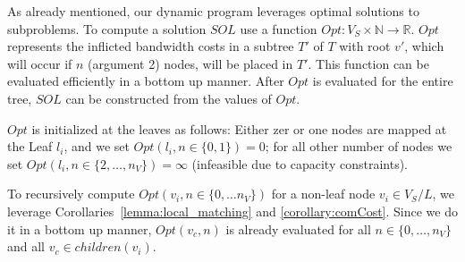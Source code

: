 \documentclass[9pt,twocolumn]{scrartcl}
\newcommand{\ChunkLocation}{\pi}
\newcommand{\SubstrateNodes}{\ensuremath{V_S}}
\newcommand{\SubstrateNode}{\ensuremath{v}}
\newcommand{\Leaf}{\ensuremath{l}}
\newcommand{\Leaves}{\ensuremath{L}}
\newcommand{\Chunks}{\ensuremath{\textsc{chunks}}}
\newcommand{\Opt}{\ensuremath{Opt}}
\newcommand{\Children}{\ensuremath{children}}
\newcommand{\ChunkCount}{\ensuremath{\textsc{cis}}}
\newcommand{\achunk}{\ensuremath{c}}
\newcommand{\Bandwidth}{\ensuremath{bw}}
\newcommand{\Tree}{\ensuremath{T}}
\newcommand{\Vms}{\ensuremath{n_V}}
\newcommand{\Sol}{\ensuremath{SOL}}
\begin{document}
As already mentioned, our dynamic program leverages optimal solutions to
subproblems. 
To compute a solution $\Sol$ use a
function $\Opt : \SubstrateNodes \times \mathbb{N} \rightarrow \mathbb{R}$.
$\Opt$ represents the inflicted bandwidth costs in a subtree $\Tree'$ of $\Tree$ 
with root $\SubstrateNode'$, which will occur if $n$ (argument 2)
nodes, will be placed in $\Tree'$.
This
function can be evaluated
efficiently in a bottom up manner. After $\Opt$ is evaluated for the entire
tree, $\Sol$ can be constructed from the values of $\Opt$.

$\Opt$ is initialized at the leaves as follows:
Either zer or one nodes are mapped at the Leaf $\Leaf_i$, 
and we set $\Opt(\Leaf_i, n \in
\{0,1\}) = 0$; for all other number of nodes we set $\Opt(\Leaf_i, n \in
\{2,\dots,\Vms\}) = \infty$ (infeasible due to capacity constraints).

To recursively compute $\Opt(\SubstrateNode_i, n \in \{0,\dots\Vms\})$ for a
non-leaf node $\SubstrateNode_i \in \SubstrateNodes / \Leaves$, we leverage
Corollaries~\ref{lemma:local_matching} and \ref{corollary:comCost}. Since
we do it in a bottom up manner, $\Opt(\SubstrateNode_c, n)$
is already evaluated for all $n \in \{0,\dots,\Vms\}$ and all
$\SubstrateNode_c \in \Children(\SubstrateNode_i)$.
\end{document}
